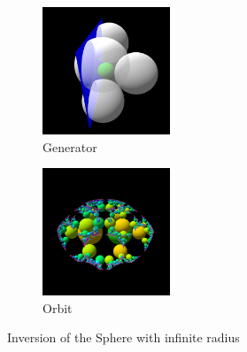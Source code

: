 \begin{figure}[h!tbp]
 \begin{minipage}[t]{0.49\hsize}
  \begin{subfigure}{0.24\textwidth}
   \begin{center}
    \includegraphics[width=1.5in, height=1.5in, keepaspectratio]{../img/klein/3diis/infSphereGen.pdf}
    \caption{Generator}
    \label{fig:infSphereGen}
   \end{center}
  \end{subfigure}
  \hspace*{\fill}
  \begin{subfigure}{0.24\textwidth}
   \begin{center}
    \includegraphics[width=1.5in, height=1.5in, keepaspectratio]{../img/klein/3diis/infSphereOrbit.pdf}
    \caption{Orbit}
    \label{fig:infSphereOrb}
   \end{center}
  \end{subfigure}
  \hspace*{\fill}
  \caption{Inversion of the Sphere with infinite radius}
  \label{fig:infSphere}

 \end{minipage}
 \hspace*{\fill}
 \begin{minipage}[t]{0.49\hsize}


\end{minipage}
\end{figure}
